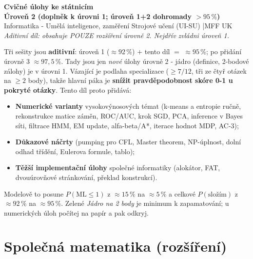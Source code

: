 \documentclass[11pt]{article}
\begin{document}
\begin{center}
  {\LARGE\bfseries\color{mffblue} Cvičné úlohy ke státnicím \\[2pt]
  Úroveň 2 \textnormal{(doplněk k úrovni 1; úroveň 1+2 dohromady $>95\,\%$)}}\\[4pt]
  {\small Informatika - Umělá inteligence, zaměření Strojové učení (UI-SU) \quad|\quad MFF UK}\\[2pt]
  {\footnotesize\itshape Aditivní díl: obsahuje POUZE rozšíření úrovně 2. Nejdřív zvládni úroveň 1.}
\end{center}

\begin{infobox}[title={Co je tohle a proč to zvedá pravděpodobnost}]
\footnotesize
Tři sešity jsou \textbf{aditivní}: úroveň 1 ($\approx92\,\%$) $+$ tento díl $=$ $\approx95\,\%$; po přidání úrovně 3 $\approx97,5\,\%$. Tady jsou jen \emph{nové} úlohy úrovně 2 - jádro (definice, 2-bodové zálohy) je v úrovni 1.
Vázající je podlaha specializace ($\ge7/12$, tři ze čtyř otázek na $\ge2$ body), takže hlavní páka je \textbf{snížit pravděpodobnost skóre 0-1 u pokryté otázky}. Tento díl proto přidává:
\begin{itemize}\setlength{\itemsep}{1pt}
  \item \textbf{Numerické varianty} vysokovýnosových témat (k-means a entropie ručně, rekonstrukce matice záměn, ROC/AUC, krok SGD, PCA, inference v Bayes síti, filtrace HMM, EM update, alfa-beta/A*, iterace hodnot MDP, AC-3);
  \item \textbf{Důkazové náčrty} (pumping pro CFL, Master theorem, NP-úplnost, dolní odhad třídění, Eulerova formule, tablo);
  \item \textbf{Těžší implementační úlohy} společné informatiky (alokátor, FAT, dvouúrovňové stránkování, překlad konstrukcí).
\end{itemize}
Modelově to posune $P(\text{ML}\le1)$ z $\approx15\,\%$ na $\approx5\,\%$ a celkové $P(\text{složím})$ z $\approx92\,\%$ na $\approx95\,\%$. Zelené \emph{Jádro na 2 body} je minimum k zapamatování; u numerických úloh počítej na papír a pak odkryj.
\end{infobox}

\tableofcontents
\bigskip

\section{Společná matematika \textnormal{\normalsize(rozšíření)}}





\end{document}
